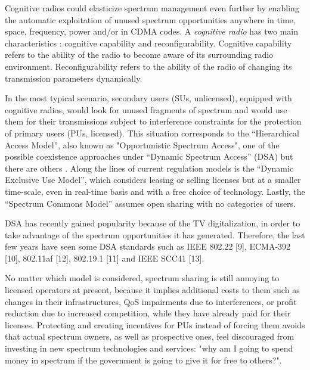 Cognitive radios \cite{ref:Mitola1999} could elasticize spectrum management even further by enabling the automatic exploitation of unused spectrum opportunities anywhere in time, space, frequency, power and/or in CDMA codes.
A \emph{cognitive radio} has two main characteristics \cite{ref:Akyildiz2006}: cognitive capability and reconfigurability. 
Cognitive capability refers to the ability of the radio to become aware of its surrounding radio environment. Reconfigurability refers to the ability of the radio of changing its transmission parameters dynamically.

In the most typical scenario, secondary users (SUs, unlicensed), equipped with cognitive radios, would look for unused fragments of spectrum and would use them for their transmissions subject to interference constraints for the protection of primary users (PUs, licensed). 
This situation corresponds to the “Hierarchical Access Model”, also known as "Opportunistic Spectrum Access", one of the possible coexistence approaches under “Dynamic Spectrum Access” (DSA) but there are others \cite{ref:Zhao2007_sur}. 
Along the lines of current regulation models is the “Dynamic Exclusive Use Model”, which considers leasing or selling licenses but at a smaller time-scale, even in real-time basis and with a free choice of technology.
Lastly, the “Spectrum Commons Model”  assumes open sharing with no categories of users.

DSA has recently gained popularity because of the TV digitalization, in order to take advantage of the spectrum opportunities it has generated. %
Therefore, the last few years have seen some DSA standards such as IEEE 802.22 [9], ECMA-392 [10], 802.11af [12], 802.19.1 [11] and IEEE SCC41 [13].

No matter which model is considered, spectrum sharing is still annoying to licensed operators at present, because it implies additional costs to them such as changes in their infrastructures, QoS impairments due to interferences, or profit reduction due to increased competition, while they have already paid for their licenses. %
Protecting and creating incentives for PUs instead of forcing them avoids that actual spectrum owners, as well as prospective ones, feel discouraged from investing in new spectrum technologies and services: "why am I going to spend money in spectrum if the government is going to give it for free to others?".

